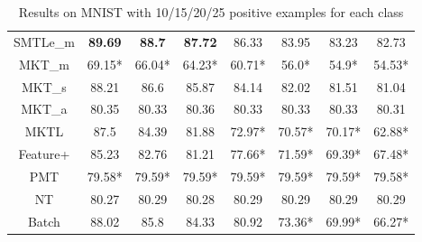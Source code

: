 \begin{table*}[h]
{{\begin{tabular}{|c|c|c|c|c|c|c|c|}
      SMTLe\_m & \textbf{89.69} & \textbf{88.7} & \textbf{87.72} & 86.33 & 83.95 & 83.23 & 82.73\\ 
      MKT\_{m} & 69.15* & 66.04* & 64.23* & 60.71* & 56.0* & 54.9* & 54.53*\\ 
      MKT\_{s} & 88.21 & 86.6 & 85.87 & 84.14 & 82.02 & 81.51 & 81.04\\ 
      MKT\_{a} & 80.35 & 80.33 & 80.36 & 80.33 & 80.33 & 80.33 & 80.31\\ 
      MKTL & 87.5 & 84.39 & 81.88 & 72.97* & 70.57* & 70.17* & 62.88*\\ 
      Feature+ & 85.23 & 82.76 & 81.21 & 77.66* & 71.59* & 69.39* & 67.48*\\ 
      PMT & 79.58* & 79.59* & 79.59* & 79.59* & 79.59* & 79.59* & 79.58*\\ 
      NT & 80.27 & 80.29 & 80.28 & 80.29 & 80.29 & 80.29 & 80.29\\ 
      Batch & 88.02 & 85.8 & 84.33 & 80.92 & 73.36* & 69.99* & 66.27*\\ 
\hline\end{tabular}}}\caption{Results on MNIST with 10/15/20/25 positive examples for each class}\label{tab:mnist}
\end{table*}



